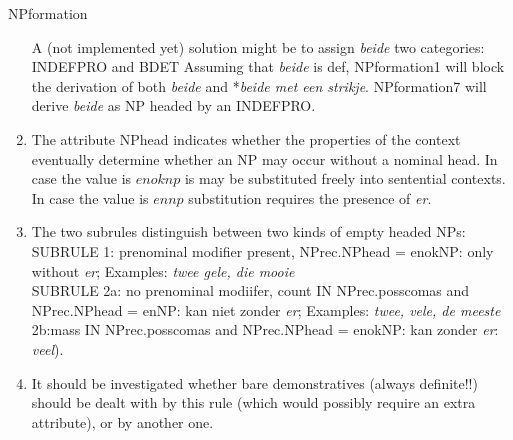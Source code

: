 \begin{mruleclass}{NPformation}
\begin{members}
\begin{member}
\begin{enumerate}
A (not implemented yet) solution might be to assign {\em beide} two categories: 
INDEFPRO and BDET
Assuming that {\em beide} is def, NPformation1 will block the derivation of 
both {\em beide} and *{\em beide met een strikje}.
NPformation7  will derive {\em beide} as NP headed by an INDEFPRO.
\item 
The attribute NPhead indicates whether the properties of the context eventually 
determine whether an NP may occur without a nominal head. 
In case the value is $enoknp$ is may be substituted freely into 
sentential contexts. In case the value is $ennp$ substitution
requires the presence of  {\em er}.
\item 
The two subrules distinguish between two kinds of empty headed NPs:\\
SUBRULE  1: prenominal modifier present, NPrec.NPhead = enokNP: 
only without {\em er}; Examples: {\em twee gele, die mooie}\\
   SUBRULE  2a: no prenominal modiifer, 
count IN NPrec.posscomas and NPrec.NPhead = enNP: 
kan niet zonder {\em er}; Examples: {\em 
twee, vele, de meeste}\\
            2b:mass IN NPrec.posscomas and NPrec.NPhead = enokNP: 
     kan zonder {\em er}: {\em veel}).
\item 
    It should be investigated whether bare demonstratives (always 
    definite!!) should be dealt with by this rule (which would possibly
    require an extra attribute), or by another one.
\end{enumerate}


\end{member}
\end{members}
\end{mruleclass}
